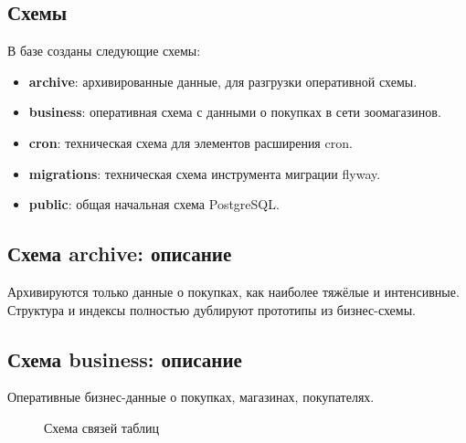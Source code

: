 \subsection{Схемы}\label{subsec:schemas}
В базе созданы следующие схемы:
\begin{itemize}
    \item \textbf{archive}: архивированные данные, для разгрузки оперативной схемы.
    \item \textbf{business}: оперативная схема с данными о покупках в сети зоомагазинов.
    \item \textbf{cron}: техническая схема для элементов расширения cron.
    \item \textbf{migrations}: техническая схема инструмента миграции flyway.
    \item \textbf{public}: общая начальная схема PostgreSQL\@.
\end{itemize}

\subsection{Схема archive: описание}\label{subsec:archive}

Архивируются только данные о покупках, как наиболее тяжёлые и интенсивные.
Структура и индексы полностью дублируют прототипы из бизнес-схемы.

\subsection{Схема business: описание}\label{subsec:business}

Оперативные бизнес-данные о покупках, магазинах, покупателях.

\begin{figure}[h]
    \centering
    \caption{Схема связей таблиц}\label{fig:figure-tables}
\end{figure}

